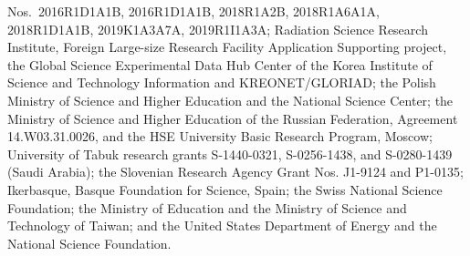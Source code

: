 \documentclass[twocolumn,aps,prd,superscriptaddress,nofootinbib,floatfix,preprintnumbers,a4]{revtex4-1}
\begin{document}
Nos.~2016R1\-D1A1B, 2016R1\-D1A1B, 2018R1\-A2B,
2018R1\-A6A1A, 2018R1\-D1A1B, 2019K1\-A3A7A,
2019R1\-I1A3A;
Radiation Science Research Institute, Foreign Large-size Research Facility Application Supporting project, the Global Science Experimental Data Hub Center of the Korea Institute of Science and Technology Information and KREONET/GLORIAD;
the Polish Ministry of Science and Higher Education and 
the National Science Center;
the Ministry of Science and Higher Education of the Russian Federation, Agreement 14.W03.31.0026, %
and the HSE University Basic Research Program, Moscow; %
University of Tabuk research grants
S-1440-0321, S-0256-1438, and S-0280-1439 (Saudi Arabia);
the Slovenian Research Agency Grant Nos. J1-9124 and P1-0135;
Ikerbasque, Basque Foundation for Science, Spain;
the Swiss National Science Foundation; 
the Ministry of Education and the Ministry of Science and Technology of Taiwan;
and the United States Department of Energy and the National Science Foundation.





\vspace{4ex}

\clearpage
\end{document}
